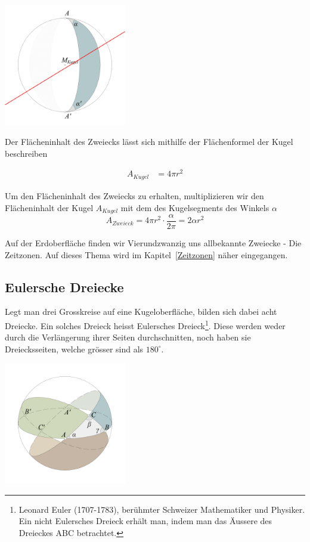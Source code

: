 \begin{refsection}
\begin{center}
        \includegraphics[width=0.4\textwidth]{kugel/Zweieck.jpg}
\end{center}

Der Flächeninhalt des Zweiecks lässt sich mithilfe der Flächenformel der Kugel beschreiben

\begin{align*}
A_{ Kugel } &= 4 \pi r^{2}
\end{align*}

Um den Flächeninhalt des Zweiecks zu erhalten, multiplizieren wir den Flächeninhalt der Kugel $A_{ Kugel }$ mit dem des Kugelsegments des Winkels $\alpha$ 
\begin{equation}
A_{ Zweieck } = 4 \pi r^{2} \cdot \frac{ \alpha }{ 2 \pi } = 2 \alpha r^{2}
\label {V5}
\end{equation}

Auf der Erdoberfläche finden wir Vierundzwanzig uns allbekannte Zweiecke - Die Zeitzonen. Auf dieses Thema wird im Kapitel~\ref{Zeitzonen}  näher eingegangen.


\subsection{Eulersche Dreiecke} \label{Euler} 
Legt man drei Grosskreise auf eine Kugeloberfläche, bilden sich dabei acht Dreiecke. 
Ein solches Dreieck heisst Eulersches Dreieck\footnote{%
Leonard Euler (1707-1783), berühmter Schweizer Mathematiker und Physiker. 
Ein nicht Eulersches Dreieck erhält man, indem man das Äussere des Dreieckes ABC betrachtet.}.
Diese werden weder durch die Verlängerung ihrer Seiten durchschnitten, 
noch haben sie Dreiecksseiten, welche grösser sind als $180^{\circ}$.

\begin{center}
        \includegraphics[width=0.4\textwidth]{kugel/EulerschesDreieck.jpg}
\end{center}


\end{refsection}
